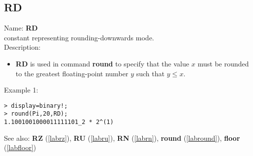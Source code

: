\subsection{RD}
\label{labrd}
\noindent Name: \textbf{RD}\\
constant representing rounding-downwards mode.\\
\noindent Description: \begin{itemize}

\item \textbf{RD} is used in command \textbf{round} to specify that the value $x$ must be rounded
   to the greatest floating-point number $y$ such that $y \le x$.
\end{itemize}
\noindent Example 1: 
\begin{center}\begin{minipage}{15cm}\begin{Verbatim}[frame=single]
> display=binary!;
> round(Pi,20,RD);
1.1001001000011111101_2 * 2^(1)
\end{Verbatim}
\end{minipage}\end{center}
See also: \textbf{RZ} (\ref{labrz}), \textbf{RU} (\ref{labru}), \textbf{RN} (\ref{labrn}), \textbf{round} (\ref{labround}), \textbf{floor} (\ref{labfloor})

